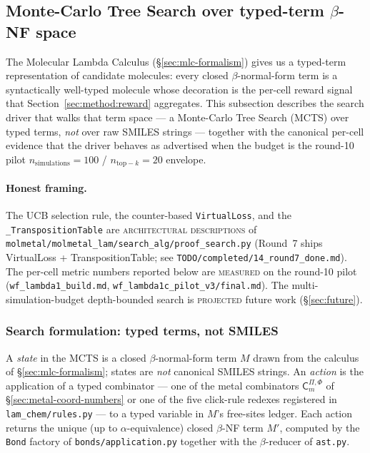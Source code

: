 \subsection{Monte-Carlo Tree Search over typed-term $\beta$-NF space}
\label{sec:mcts-betanf}

The Molecular Lambda Calculus (\S\ref{sec:mlc-formalism}) gives us a
typed-term representation of candidate molecules: every closed
$\beta$-normal-form term is a syntactically well-typed molecule
whose decoration is the per-cell reward signal that Section~\ref{sec:method:reward}
aggregates.  This subsection describes the search driver that walks
that term space --- a Monte-Carlo Tree Search (MCTS) over typed
terms, \emph{not} over raw SMILES strings --- together with the
canonical per-cell evidence that the driver behaves as advertised
when the budget is the round-10 pilot
$n_{\mathrm{simulations}}=100$ / $n_{\mathrm{top-}k}=20$ envelope.

\paragraph{Honest framing.}
The UCB selection rule, the counter-based \texttt{VirtualLoss}, and
the \texttt{\_TranspositionTable} are \textsc{architectural
descriptions} of
\texttt{molmetal/molmetal\_lam/search\_alg/proof\_search.py} (Round~7
ships VirtualLoss + TranspositionTable; see
\texttt{TODO/completed/14\_round7\_done.md}).  The per-cell metric
numbers reported below are \textsc{measured} on the round-10 pilot
(\texttt{wf\_lambda1\_build.md},
\texttt{wf\_lambda1c\_pilot\_v3/final.md}).  The
multi-simulation-budget depth-bounded search is
\textsc{projected} future work (\S\ref{sec:future}).

\subsubsection{Search formulation: typed terms, not SMILES}
\label{sec:mcts-typed-terms}

A \emph{state} in the MCTS is a closed $\beta$-normal-form term
$M$ drawn from the calculus of \S\ref{sec:mlc-formalism}; states
are \emph{not} canonical SMILES strings.  An \emph{action} is the
application of a typed combinator --- one of the metal combinators
$\mathsf{C}^{\Pi,\Phi}_{m}$ of
\S\ref{sec:metal-coord-numbers} or one of the five click-rule
redexes registered in \texttt{lam\_chem/rules.py} --- to a typed
variable in $M$'s free-sites ledger.  Each action returns the
unique (up to $\alpha$-equivalence) closed $\beta$-NF term
$M'$, computed by the \texttt{Bond} factory of
\texttt{bonds/application.py} together with the
$\beta$-reducer of \texttt{ast.py}.

